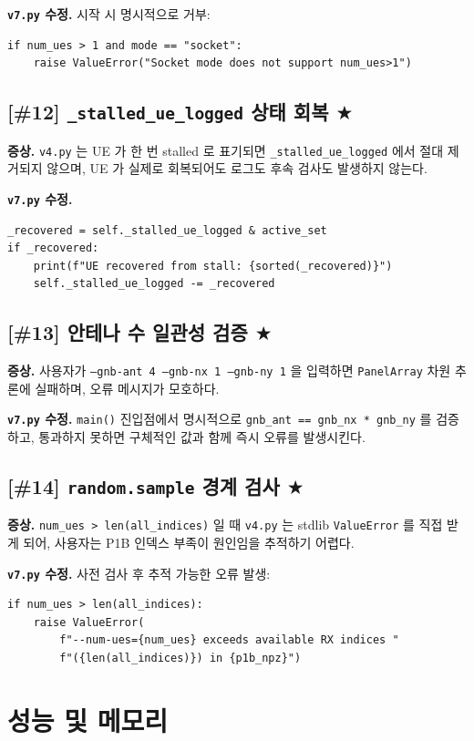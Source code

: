 \documentclass[11pt,a4paper]{article}
\newcommand{\sone}{\textcolor{starcolor}{$\bigstar$}}
\newcommand{\vfour}{\texttt{v4.py}}
\newcommand{\vseven}{\texttt{v7.py}}
\newcommand{\bugitem}[3]{%
  \subsection{[\##1] #2 \hfill #3}%
  \vspace{-0.5em}%
}
\begin{document}
\textbf{\vseven{} 수정.} 시작 시 명시적으로 거부:
\begin{verbatim}
if num_ues > 1 and mode == "socket":
    raise ValueError("Socket mode does not support num_ues>1")
\end{verbatim}

\bugitem{12}{\texttt{\_stalled\_ue\_logged} 상태 회복}{\sone}

\textbf{증상.} \vfour{} 는 UE 가 한 번 stalled 로 표기되면
\texttt{\_stalled\_ue\_logged} 에서 절대 제거되지 않으며, UE 가 실제로
회복되어도 로그도 후속 검사도 발생하지 않는다.

\textbf{\vseven{} 수정.}
\begin{verbatim}
_recovered = self._stalled_ue_logged & active_set
if _recovered:
    print(f"UE recovered from stall: {sorted(_recovered)}")
    self._stalled_ue_logged -= _recovered
\end{verbatim}

\bugitem{13}{안테나 수 일관성 검증}{\sone}

\textbf{증상.} 사용자가 \texttt{--gnb-ant 4 --gnb-nx 1 --gnb-ny 1} 을
입력하면 \texttt{PanelArray} 차원 추론에 실패하며, 오류 메시지가 모호하다.

\textbf{\vseven{} 수정.} \texttt{main()} 진입점에서 명시적으로
\texttt{gnb\_ant == gnb\_nx * gnb\_ny} 를 검증하고, 통과하지 못하면 구체적인
값과 함께 즉시 오류를 발생시킨다.

\bugitem{14}{\texttt{random.sample} 경계 검사}{\sone}

\textbf{증상.} \texttt{num\_ues > len(all\_indices)} 일 때 \vfour{} 는
stdlib \texttt{ValueError} 를 직접 받게 되어, 사용자는 P1B 인덱스 부족이
원인임을 추적하기 어렵다.

\textbf{\vseven{} 수정.} 사전 검사 후 추적 가능한 오류 발생:
\begin{verbatim}
if num_ues > len(all_indices):
    raise ValueError(
        f"--num-ues={num_ues} exceeds available RX indices "
        f"({len(all_indices)}) in {p1b_npz}")
\end{verbatim}

\section{성능 및 메모리}
\label{sec:performance}
\end{document}
